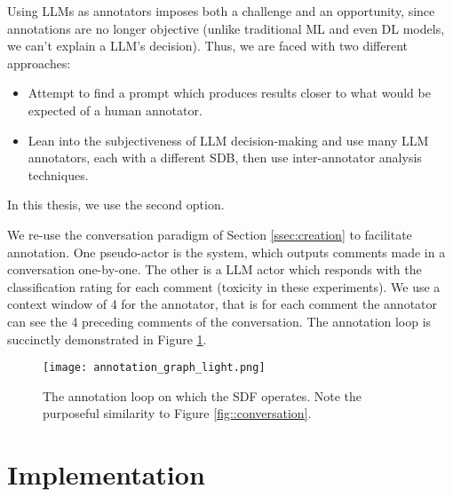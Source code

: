 Using LLMs as annotators imposes both a challenge and an opportunity, since annotations are no longer objective (unlike traditional ML and even DL models, we can't explain a LLM's decision). Thus, we are faced with two different approaches:

\begin{itemize}
	\item Attempt to find a prompt which produces results closer to what would be expected of a human annotator.
	\item Lean into the subjectiveness of LLM decision-making and use many LLM annotators, each with a different SDB, then use inter-annotator analysis techniques.
\end{itemize}

In this thesis, we use the second option.

We re-use the conversation paradigm of Section \ref{ssec:creation} to facilitate annotation. One pseudo-actor is the system, which outputs comments made in a conversation one-by-one. The other is a LLM actor which responds with the classification rating for each comment (toxicity in these experiments).  We use a context window of 4 for the annotator, that is for each comment the annotator can see the 4 preceding comments of the conversation. The annotation loop is succinctly demonstrated in Figure \ref{fig::annotation}.

\begin{figure}
	\centering
	\texttt{[image: annotation\_graph\_light.png]}
	\caption{The annotation loop on which the SDF operates. Note the purposeful similarity to Figure \ref{fig::conversation}.}
	\label{fig::annotation}
\end{figure}



\section{Implementation}
\label{sec:system:implementation}

